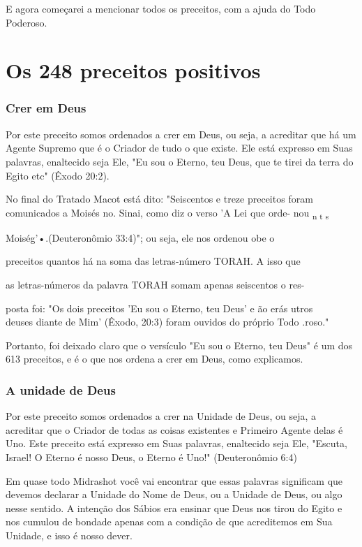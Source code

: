E agora começarei a mencionar todos os preceitos, com a ajuda do Todo
Poderoso.




\part{Os 248 preceitos positivos}

\section{Crer em Deus} %

Por este preceito somos ordenados a crer em Deus, ou seja, a acredi­tar
que há um Agente Supremo que é o Criador de tudo o que existe. Ele está
expresso em Suas palavras, enaltecido seja Ele, "Eu sou o Eterno, teu
Deus, que te tirei da terra do Egito etc" (Êxodo 20:2).

No final do Tratado Macot está dito: "Seiscentos e treze preceitos
foram comunicados a Moisés no. Sinai, como diz o verso 'A Lei que orde-
nou \textsubscript{n t s}


Moiség'•.(Deuteronômio 33:4)"; ou seja, ele nos
ordenou obe o


preceitos quantos há na soma das letras-número TORAH. A isso que

as letras-números da palavra TORAH somam apenas seiscentos o res-

posta foi: "Os dois preceitos 'Eu sou o Eterno, teu Deus' e ão erás
utros\\
deuses diante de Mim' (Êxodo, 20:3) foram ouvidos do próprio Todo
.roso."

Portanto, foi deixado claro que o versículo "Eu sou o Eterno, teu Deus"
é um dos 613 preceitos, e é o que nos ordena a crer em Deus, como
explicamos.

\section{A unidade de Deus}

Por este preceito somos ordenados a crer na Unidade de Deus, ou seja, a
acreditar que o Criador de todas as coisas existentes e Primeiro Agente
delas é Uno. Este preceito está expresso em Suas palavras, enaltecido
seja Ele, "Escuta, Israel! O Eterno é nosso Deus, o Eterno é Uno!"
(Deuteronômio 6:4)

Em quase todo Midrashot você vai encontrar que essas palavras
sig­nificam que devemos declarar a Unidade do Nome de Deus, ou a Unidade
de Deus, ou algo nesse sentido. A intenção dos Sábios era ensinar que
Deus nos tirou do Egito e nos cumulou de bondade apenas com a condição
de que acre­ditemos em Sua Unidade, e isso é nosso dever.

